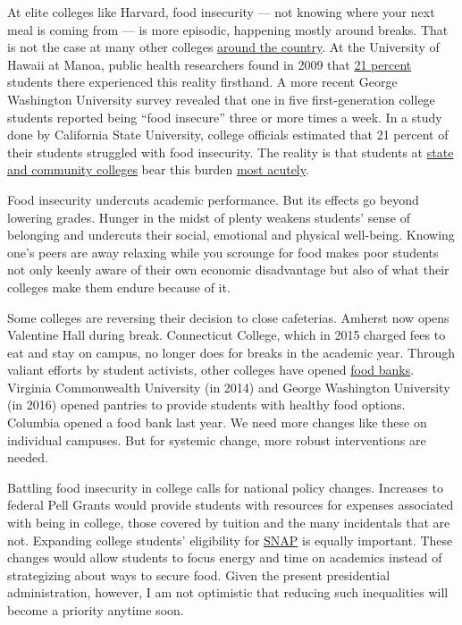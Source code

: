 At elite colleges like Harvard, food insecurity --- not knowing where
your next meal is coming from --- is more episodic, happening mostly
around breaks. That is not the case at many other colleges
\href{https://studentsagainsthunger.org/hunger-on-campus/}{around the
country}. At the University of Hawaii at Manoa, public health
researchers found in 2009 that
\href{https://www.cambridge.org/core/journals/public-health-nutrition/article/div-classtitlefood-insecurity-prevalence-among-college-students-at-the-university-of-hawaii-at-mnoadiv/21D2F99685FB0C06061003AB6B9DEE62}{21
percent} students there experienced this reality firsthand. A more
recent George Washington University survey revealed that one in five
first-generation college students reported being ``food insecure'' three
or more times a week. In a study done by California State University,
college officials estimated that 21 percent of their students struggled
with food insecurity. The reality is that students at
\href{https://www.nytimes.com/2015/12/04/opinion/hungry-homeless-and-in-college.html}{state
and community colleges} bear this burden
\href{https://www.nytimes.com/2018/01/14/opinion/hunger-college-food-insecurity.html}{most
acutely}.

Food insecurity undercuts academic performance. But its effects go
beyond lowering grades. Hunger in the midst of plenty weakens students'
sense of belonging and undercuts their social, emotional and physical
well-being. Knowing one's peers are away relaxing while you scrounge for
food makes poor students not only keenly aware of their own economic
disadvantage but also of what their colleges make them endure because of
it.

Some colleges are reversing their decision to close cafeterias. Amherst
now opens Valentine Hall during break. Connecticut College, which in
2015 charged fees to eat and stay on campus, no longer does for breaks
in the academic year. Through valiant efforts by student activists,
other colleges have opened
\href{http://www.npr.org/sections/thesalt/2016/10/14/497948224/more-colleges-open-food-pantries-to-address-campus-hunger}{food
banks}. Virginia Commonwealth University (in 2014) and George Washington
University (in 2016) opened pantries to provide students with healthy
food options. Columbia opened a food bank last year. We need more
changes like these on individual campuses. But for systemic change, more
robust interventions are needed.

Battling food insecurity in college calls for national policy changes.
Increases to federal Pell Grants would provide students with resources
for expenses associated with being in college, those covered by tuition
and the many incidentals that are not. Expanding college students'
eligibility for
\href{https://www.benefits.gov/benefits/benefit-details/361}{SNAP} is
equally important. These changes would allow students to focus energy
and time on academics instead of strategizing about ways to secure food.
Given the present presidential administration, however, I am not
optimistic that reducing such inequalities will become a priority
anytime soon.

